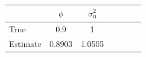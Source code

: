\begin{tabular}{lcccccc}
\toprule
& $\phi$ & $\sigma_\eta^2$ \\
\midrule
True & 0.9 & 1 \\
Estimate & 0.8903 & 1.0505 \\
\bottomrule
\end{tabular}
